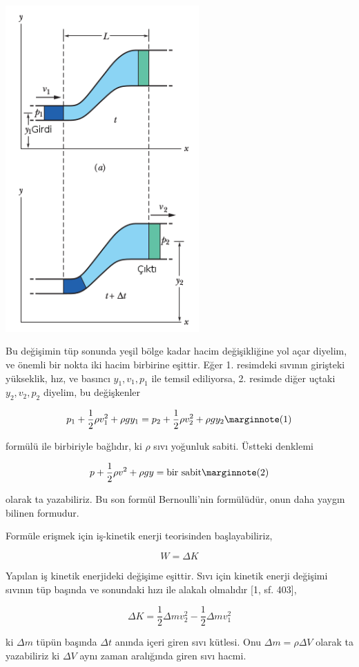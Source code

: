 \documentclass[12pt,fleqn]{article}\usepackage{../../common}
\begin{document}
\includegraphics[width=20em]{phy_045_flight_02.png}

Bu değişimin tüp sonunda yeşil bölge kadar hacim değişikliğine yol
açar diyelim, ve önemli bir nokta iki hacim birbirine eşittir.  Eğer
1. resimdeki sıvının girişteki yükseklik, hız, ve basıncı
$y_1,v_1,p_1$ ile temsil ediliyorsa, 2. resimde diğer uçtaki
$y_2,v_2,p_2$ diyelim, bu değişkenler

$$
p_1 + \frac{1}{2} \rho v_1^2 + \rho g y_1 =
p_2 + \frac{1}{2} \rho v_2^2 + \rho g y_2 
\mlabel{1}
$$

formülü ile birbiriyle bağlıdır, ki $\rho$ sıvı yoğunluk
sabiti. Üstteki denklemi

$$
p + \frac{1}{2} \rho v^2 + \rho g y = \textrm{bir sabit}
\mlabel{2}
$$

olarak ta yazabiliriz. Bu son formül Bernoulli'nin formülüdür, onun
daha yaygın bilinen formudur.

Formüle erişmek için iş-kinetik enerji teorisinden başlayabiliriz, 

$$
W = \Delta K
$$

Yapılan iş kinetik enerjideki değişime eşittir. Sıvı için kinetik enerji
değişimi sıvının tüp başında ve sonundaki hızı ile alakalı olmalıdır [1,
sf. 403],

$$
\Delta K = \frac{1}{2} \Delta m v_2^2 - \frac{1}{2} \Delta m v_1^2 
$$

ki $\Delta m$ tüpün başında $\Delta t$ anında içeri giren sıvı kütlesi. Onu
$\Delta m = \rho \Delta V$ olarak ta yazabiliriz ki $\Delta V$ aynı zaman
aralığında giren sıvı hacmi.
\end{document}
